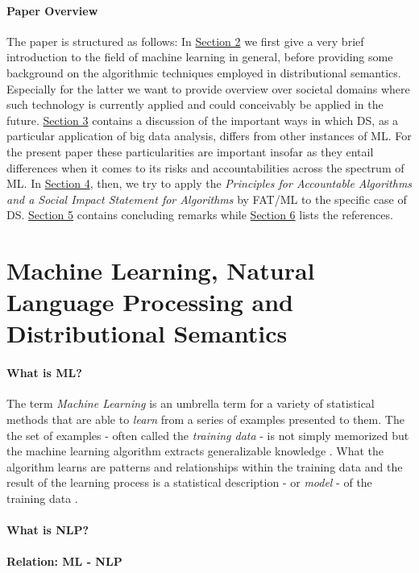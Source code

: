 \documentclass{article}
\begin{document}
\paragraph{Paper Overview}
The paper is structured as follows: In \hyperlink{sec2}{Section 2} we first give a very brief introduction to the field of machine learning in general, before providing some background on the algorithmic techniques employed in distributional semantics. Especially for the latter we want to provide overview over societal domains where such technology is currently applied and could conceivably be applied in the future. \hyperlink{sec3}{Section 3} contains a discussion of the important ways in which DS, as a particular application of big data analysis, differs from other instances of ML. For the present paper these particularities are important insofar as they entail differences when it comes to its risks and accountabilities across the spectrum of ML. In \hyperlink{sec4}{Section 4}, then, we try to apply the \emph{Principles for Accountable Algorithms and a Social Impact Statement for Algorithms} by FAT/ML to the specific case of DS. \hyperlink{sec5}{Section 5} contains concluding remarks while \hyperlink{sec6}{Section 6} lists the references.
\section{Machine Learning, Natural Language Processing and Distributional Semantics}\hypertarget{sec3}{ }
\paragraph{What is ML?}
The term \emph{Machine Learning} is an umbrella term for a variety of statistical methods that are able to \emph{learn} from a series of examples presented to them. The the set of examples - often called the \emph{training data} - is not simply memorized but the machine learning algorithm extracts generalizable knowledge \cite{domingos2012few}.
 What the algorithm learns are patterns and relationships within the training data and the result of the learning process is a statistical description - or \emph{model} - of the training data \cite{fayyad2001digital}.
\paragraph{What is NLP?}
\paragraph{Relation: ML - NLP}
\end{document}
